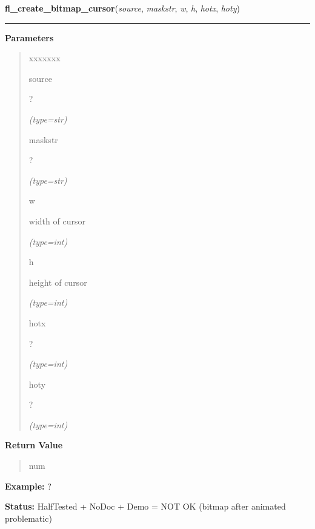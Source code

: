 \hspace{.8\funcindent}\begin{boxedminipage}{\funcwidth}

    \raggedright \textbf{fl\_create\_bitmap\_cursor}(\textit{source}, \textit{maskstr}, \textit{w}, \textit{h}, \textit{hotx}, \textit{hoty})

    \vspace{-1.5ex}

    \rule{\textwidth}{0.5\fboxrule}
\setlength{\parskip}{2ex}
\setlength{\parskip}{1ex}
      \textbf{Parameters}
      \vspace{-1ex}

      \begin{quote}
        \begin{Ventry}{xxxxxxx}

          \item[source]

          ?

            {\it (type=str)}

          \item[maskstr]

          ?

            {\it (type=str)}

          \item[w]

          width of cursor

            {\it (type=int)}

          \item[h]

          height of cursor

            {\it (type=int)}

          \item[hotx]

          ?

            {\it (type=int)}

          \item[hoty]

          ?

            {\it (type=int)}

        \end{Ventry}

      \end{quote}

      \textbf{Return Value}
    \vspace{-1ex}

      \begin{quote}
      num

      \end{quote}

\textbf{Example:} ?



\textbf{Status:} HalfTested + NoDoc + Demo = NOT OK (bitmap after animated problematic)



    \end{boxedminipage}

